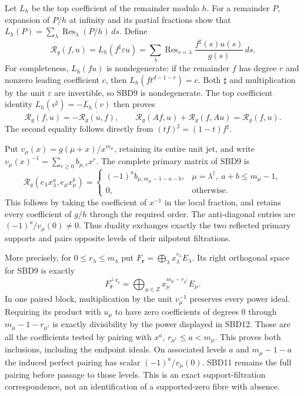 Let $L_h$ be the top coefficient of the remainder modulo $h$.
For a remainder $P$, expansion of $P/h$ at infinity and its
partial fractions show that
$L_h(P)=\sum_\lambda\operatorname{Res}_\lambda(P/h)\,ds$.
Define
\[
 \mathcal R_g(f,u)=L_h(f^\sharp\varepsilon u)
   =\sum_\lambda\operatorname{Res}_{s=\lambda}
                         \frac{f^\sharp(s)u(s)}{g(s)}\,ds.
 \tag{SBD9}
\]
For completeness, $L_h(fu)$ is nondegenerate: if the remainder
$f$ has degree $r$ and nonzero leading coefficient $c$, then
$L_h(ft^{d-1-r})=c$. Both $\sharp$ and multiplication by the
unit $\varepsilon$ are invertible, so SBD9 is nondegenerate.
The top coefficient identity
$L_h(v^\sharp)=-\overline{L_h(v)}$ then proves
\[
 \mathcal R_g(f,u)=-\overline{\mathcal R_g(u,f)},\qquad
 \mathcal R_g(Af,u)+\mathcal R_g(f,Au)=\mathcal R_g(f,u).
 \tag{SBD10}
\]
The second equality follows directly from $(tf)^\sharp=(1-t)f^\sharp$.

Put $v_\mu(x)=g(\mu+x)/x^{m_\mu}$, retaining its entire
unit jet, and write $v_\mu(x)^{-1}=\sum_{r\geq0}b_{\mu,r}x^r$.
The complete primary matrix of SBD9 is
\[
 \mathcal R_g(e_\lambda x_\lambda^a,e_\mu x_\mu^b)
 =\begin{cases}
 (-1)^a b_{\mu,m_\mu-1-a-b},&\mu=\lambda^\dagger,
                                      \ a+b\leq m_\mu-1,\\
 0,&\text{otherwise}.
 \end{cases}
 \tag{SBD11}
\]
This follows by taking the coefficient of $x^{-1}$ in the
local fraction, and retains every coefficient of $g/h$ through
the required order. The anti-diagonal entries are
$(-1)^a/v_\mu(0)\ne0$. Thus duality exchanges exactly the
two reflected primary supports and pairs opposite levels of
their nilpotent filtrations.

More precisely, for $0\leq r_\lambda\leq m_\lambda$ put
$F_{\boldsymbol r}=\bigoplus_\lambda x_\lambda^{r_\lambda}E_\lambda$.
Its right orthogonal space for SBD9 is exactly
\[
 F_{\boldsymbol r}^{\perp_{\mathcal R_g}}
       =\bigoplus_{\mu\in Z}
                x_\mu^{m_\mu-r_{\mu^\dagger}}E_\mu.
 \tag{SBD12}
\]
In one paired block, multiplication by the unit $v_\mu^{-1}$
preserves every power ideal. Requiring its product with $u_\mu$
to have zero coefficients of degrees $0$ through
$m_\mu-1-r_{\mu^\dagger}$ is exactly divisibility by the
power displayed in SBD12. Those are all the coefficients tested
by pairing with $x^a$, $r_{\mu^\dagger}\leq a<m_\mu$.
This proves both inclusions, including the endpoint ideals.
On associated levels $a$ and $m_\mu-1-a$ the induced perfect
pairing has scalar $(-1)^a/v_\mu(0)$. SBD11 remains the full
pairing before passage to those levels. This is an exact
support-filtration correspondence, not an identification of a
supported-zero fibre with absence.

